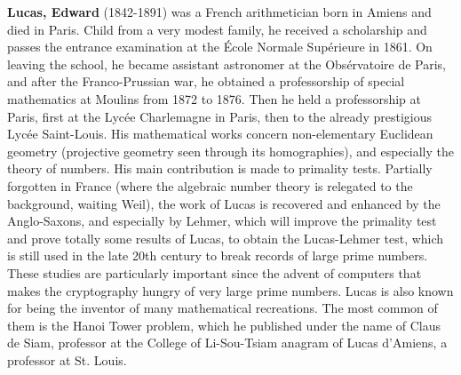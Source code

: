 \textbf{Lucas, Edward} (1842-1891) was a French arithmetician born in Amiens and died in Paris. Child from a very modest family, he received a scholarship and passes the entrance examination at the École Normale Supérieure in 1861. On leaving the school, he became assistant astronomer at the Obsérvatoire de Paris, and after the Franco-Prussian war, he obtained a professorship of special mathematics at Moulins from 1872 to 1876. Then he held a professorship at Paris, first at the Lycée Charlemagne in Paris, then to the already prestigious Lycée Saint-Louis. His mathematical works concern non-elementary Euclidean geometry (projective geometry seen through its homographies), and especially the theory of numbers. His main contribution is made to primality tests. Partially forgotten in France (where the algebraic number theory is relegated to the background, waiting Weil), the work of Lucas is recovered and enhanced by the Anglo-Saxons, and especially by Lehmer, which will improve the primality test and prove totally some results of Lucas, to obtain the Lucas-Lehmer test, which is still used in the late 20th century to break records of large prime numbers. These studies are particularly important since the advent of computers that makes the cryptography hungry of very large prime numbers. Lucas is also known for being the inventor of many mathematical recreations. The most common of them is the Hanoi Tower problem, which he published under the name of Claus de Siam, professor at the College of Li-Sou-Tsiam anagram of Lucas d'Amiens, a professor at St. Louis.

{}

